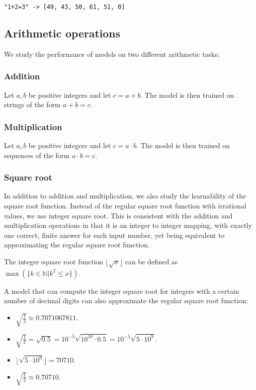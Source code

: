 \begin{lstlisting}
"1+2=3" -> [49, 43, 50, 61, 51, 0]
\end{lstlisting}

\subsection{Arithmetic operations}

We study the performance of models on two different arithmetic tasks:

\subsubsection{Addition}

Let $a, b$ be positive integers and let $c=a+b$. The model is then trained on strings of the form $a+b=c$.

\subsubsection{Multiplication}

Let $a, b$ be positive integers and let $c=a \cdot b$. The model is then trained on sequences of the form $a \cdot b=c$.

\subsubsection{Square root}
\label{isqrt}

In addition to addition and multiplication, we also study the learnability of the square root function. Instead of the regular square root function with irrational values, we use integer square root. This is consistent with the addition and multiplication operations in that it is an integer to integer mapping, with exactly one correct, finite answer for each input number, yet being equivalent to approximating the regular square root function.

The integer square root function $\lfloor \sqrt{x} \rfloor$ can be defined as $\max(\{ k \in \mathbb{N} | k^2 \leq x \})$.

A model that can compute the integer square root for integers with a certain number of decimal digits can also approximate the regular square root function:

\begin{itemize}
    \item $\sqrt{\frac{1}{2}} \approx 0.7071067811$.
    \item $\sqrt{\frac{1}{2}} = \sqrt{0.5} = 10^{-5} \sqrt{10^{10} \cdot 0.5}
    = 10^{-5} \sqrt{5 \cdot 10^9}$.
    \item $\lfloor \sqrt{5 \cdot 10^9} \rfloor = 70710$.
    \item $\sqrt{\frac{1}{2}} \approx 0.70710$.
\end{itemize}

